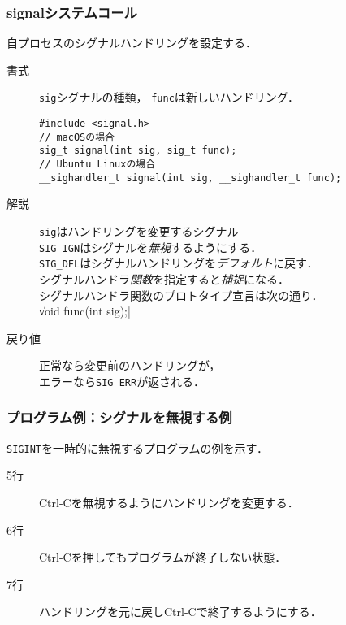 \documentclass{beamer}                 %
\begin{document}
\begin{frame}[fragile]
  \frametitle{signalシステムコール}
  自プロセスのシグナルハンドリングを設定する．
  
  \begin{description}
  \item[書式] \texttt{sig}シグナルの種類，
    \texttt{func}は新しいハンドリング．

{\small\begin{verbatim}
#include <signal.h>
// macOSの場合
sig_t signal(int sig, sig_t func);
// Ubuntu Linuxの場合
__sighandler_t signal(int sig, __sighandler_t func);
\end{verbatim}}

  \item[解説] \texttt{sig}はハンドリングを変更するシグナル\\
    \texttt{SIG\_IGN}はシグナルを\emph{無視}するようにする．\\
    \texttt{SIG\_DFL}はシグナルハンドリングを\emph{デフォルト}に戻す．\\
    シグナルハンドラ\emph{関数}を指定すると\emph{捕捉}になる．\\
    シグナルハンドラ関数のプロトタイプ宣言は次の通り．\\
    \|void func(int sig);|

  \item[戻り値] 正常なら変更前のハンドリングが，\\
    エラーなら\texttt{SIG\_ERR}が返される．
  \end{description}
\end{frame}

\begin{frame}[fragile]
  \frametitle{プログラム例：シグナルを無視する例}
  \texttt{SIGINT}を一時的に無視するプログラムの例を示す．

  \begin{quote}
  \end{quote}

  \begin{description}
  \item[5行] Ctrl-Cを無視するようにハンドリングを変更する．
  \item[6行] Ctrl-Cを押してもプログラムが終了しない状態．
  \item[7行] ハンドリングを元に戻しCtrl-Cで終了するようにする．
  \end{description}
\end{frame}
\end{document}
